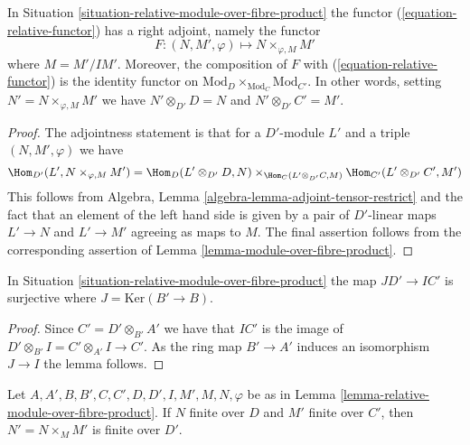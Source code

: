 \begin{lemma}
\label{lemma-relative-module-over-fibre-product}
In Situation \ref{situation-relative-module-over-fibre-product}
the functor (\ref{equation-relative-functor}) has a right adjoint, namely
the functor
$$
F : (N, M', \varphi) \longmapsto N \times_{\varphi, M} M'
$$
where $M = M'/IM'$. Moreover, the composition of $F$ with
(\ref{equation-relative-functor}) is the identity functor on
$\text{Mod}_D \times_{\text{Mod}_C} \text{Mod}_{C'}$. In other words,
setting $N' = N \times_{\varphi, M} M'$ we have
$N' \otimes_{D'} D = N$ and $N' \otimes_{D'} C' = M'$.
\end{lemma}

\begin{proof}
The adjointness statement is that for a $D'$-module $L'$ and
a triple $(N, M', \varphi)$ we have
$$
\Hom_{D'}(L', N \times_{\varphi, M} M') =
\Hom_D(L' \otimes_{D'} D, N)
\times_{\Hom_C(L' \otimes_{D'} C, M)}
\Hom_{C'}(L' \otimes_{D'} C', M')
$$
This follows from
Algebra, Lemma \ref{algebra-lemma-adjoint-tensor-restrict}
and the fact that an element of the left hand side is given by a pair
of $D'$-linear maps $L' \to N$ and $L' \to M'$ agreeing as maps to $M$.
The final assertion follows from the corresponding assertion of
Lemma \ref{lemma-module-over-fibre-product}.
\end{proof}

\begin{lemma}
\label{lemma-relative-surjection-ideals}
In Situation \ref{situation-relative-module-over-fibre-product}
the map $JD' \to IC'$ is surjective where $J = \text{Ker}(B' \to B)$.
\end{lemma}

\begin{proof}
Since $C' = D' \otimes_{B'} A'$ we have that $IC'$ is the image
of $D' \otimes_{B'} I = C' \otimes_{A'} I \to C'$. As the ring
map $B' \to A'$ induces an isomorphism $J \to I$ the lemma follows.
\end{proof}

\begin{lemma}
\label{lemma-relative-finite-module-over-fibre-product}
Let $A, A', B, B', C, C', D, D', I, M', M, N, \varphi$ be as in
Lemma \ref{lemma-relative-module-over-fibre-product}.
If $N$ finite over $D$ and $M'$
finite over $C'$, then $N' = N \times_M M'$ is finite over $D'$.
\end{lemma}

